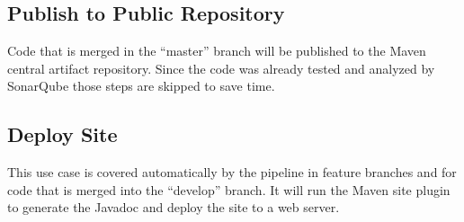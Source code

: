 \documentclass[10pt,abstract=yes,toc=flat]{docusimple}
\begin{document}
\subsection{Publish to Public Repository}

Code that is merged in the ``master'' branch will be published to the Maven 
central artifact repository. Since the code was already tested and analyzed by 
SonarQube those steps are skipped to save time.

\subsection{Deploy Site}

This use case is covered automatically by the pipeline in feature branches
and for code that is merged into the ``develop'' branch. It will run the
Maven site plugin to generate the Javadoc and deploy the site to a web
server.

% 
% 
% 
% 
% 
% 
% 
\end{document}
